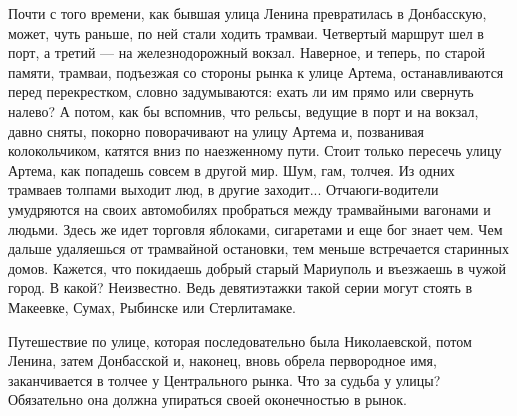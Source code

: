 Почти с того времени, как бывшая улица Ленина превратилась в Донбасскую, может,
чуть раньше, по ней стали ходить трамваи. Четвертый маршрут шел в порт, а
третий — на железнодорожный вокзал. Наверное, и теперь, по старой памяти,
трамваи, подъезжая со стороны рынка к улице Артема, останавливаются перед
перекрестком, словно задумываются: ехать ли им прямо или свернуть налево? А
потом, как бы вспомнив, что рельсы, ведущие в порт и на вокзал, давно сняты,
покорно поворачивают на улицу Артема и, позванивая колокольчиком, катятся вниз
по наезженному пути. Стоит только пересечь улицу Артема, как попадешь совсем в
другой мир. Шум, гам, толчея. Из одних трамваев толпами выходит люд, в другие
заходит... Отчаюги-водители умудряются на своих автомобилях пробраться между
трамвайными вагонами и людьми. Здесь же идет торговля яблоками, сигаретами и
еще бог знает чем.  Чем дальше удаляешься от трамвайной остановки, тем меньше
встречается старинных домов. Кажется, что покидаешь добрый старый Мариуполь и
въезжаешь в чужой город. В какой? Неизвестно. Ведь девятиэтажки такой серии
могут стоять в Макеевке, Сумах, Рыбинске или Стерлитамаке.


Путешествие по улице, которая последовательно была Николаевской, потом Ленина,
затем Донбасской и, наконец, вновь обрела первородное имя, заканчивается в
толчее у Центрального рынка. Что за судьба у улицы? Обязательно она должна
упираться своей оконечностью в рынок.
